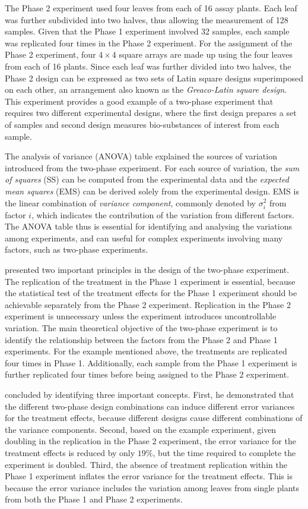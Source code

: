 \documentclass[11pt,a4paper]{article}
\begin{document}
The Phase 2 experiment used four leaves from each of 16 assay plants. Each leaf was further subdivided into two halves, thus allowing the measurement of 128 samples. Given that the Phase 1 experiment involved 32 samples, each sample was replicated four times in the Phase 2 experiment. For the assignment of the Phase 2 experiment, four $4 \times 4$ square arrays are made up using the four leaves from each of 16 plants. Since each leaf was further divided into two halves, the Phase 2 design can be expressed as two sets of Latin square designs superimposed on each other, an arrangement also known as the \emph{Greaco-Latin square design}. This experiment provides a good example of a two-phase experiment that requires two different experimental designs, where the first design prepares a set of samples and second design measures bio-substances of interest from each sample. 

The analysis of variance (ANOVA) table explained the sources of variation introduced from the two-phase experiment. For each source of variation, the \emph{sum of squares} (SS) can be computed from the experimental data and the \emph{expected mean squares} (EMS) can be derived solely from the experimental design. EMS is the linear combination of \emph{variance component}, commonly denoted by $\sigma_{i}^2$ from factor $i$, which indicates the contribution of the variation from different factors. The ANOVA table thus is essential for identifying and analysing the variations among experiments, and can useful for complex experiments involving many factors, such as two-phase experiments. 

\cite{McIntyre1955} presented two important principles in the design of the two-phase experiment. The replication of the treatment in the Phase 1 experiment is essential, because the statistical test of the treatment effects for the Phase 1 experiment should be achievable separately from the Phase 2 experiment. Replication in the Phase 2 experiment is unnecessary unless the experiment introduces uncontrollable variation. The main theoretical objective of the two-phase experiment is to identify the relationship between the factors from the Phase 2 and Phase 1 experiments. For the example mentioned above, the treatments are replicated four times in Phase 1. Additionally, each sample from the Phase 1 experiment is further replicated four times before being assigned to the Phase 2 experiment. 

\cite{McIntyre1955} concluded by identifying three important concepts. First, he demonstrated that the different two-phase design combinations can induce different error variances for the treatment effects, because different designs cause different combinations of the variance components. Second, based on the example experiment, given doubling in the replication in the Phase 2 experiment, the error variance for the treatment effects is reduced by only $19\%$, but the time required to complete the experiment is doubled. Third, the absence of treatment replication within the Phase 1 experiment inflates the error variance for the treatment effects. This is because the error variance includes the variation among leaves from single plants from both the Phase 1 and Phase 2 experiments. 
\end{document}
